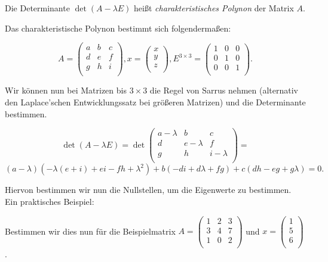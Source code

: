 \documentclass{scrartcl}
\begin{document}
Die Determinante $\det\left(A - \lambda E\right)$ heißt \textit{charakteristisches Polynon} der Matrix $A$.

Das charakteristische Polynon bestimmt sich folgendermaßen:

\begin{equation}
	A = \begin{pmatrix*}
		a & b & c \\
		d & e & f \\
		g & h & i \\
	\end{pmatrix*},
	x = \begin{pmatrix*}
		x \\
		y \\
		z \\
	\end{pmatrix*},
	E^{3\times 3} = \begin{pmatrix*}
		1 & 0 & 0 \\
		0 & 1 & 0 \\
		0 & 0 & 1 \\
	\end{pmatrix*}.
\end{equation}

Wir können nun bei Matrizen bis $3 \times 3$ die Regel von Sarrus nehmen (alternativ
den Laplace'schen Entwicklungssatz bei größeren Matrizen) und die Determinante 
bestimmen.

\begin{equation}
	\det(A - \lambda E) = \det\begin{pmatrix*}
		a - \lambda	& b		& c		\\
		d		& e - \lambda	& f		\\
		g		& h		& i - \lambda	\\
	\end{pmatrix*} =
\end{equation}
\begin{equation}
	(a - \lambda)(-\lambda(e + i)+ei -fh + \lambda^2) +b(-di + d\lambda + fg) + c(dh - eg + g\lambda) = 0.
\end{equation}

Hiervon bestimmen wir nun die Nullstellen, um die Eigenwerte zu bestimmen. Ein praktisches Beispiel:

Bestimmen wir dies nun für die Beispielmatrix $A = \begin{pmatrix*}
	1 & 2 & 3 \\
	3 & 4 & 7 \\
	1 & 0 & 2 \\
\end{pmatrix*}$ und $x = \begin{pmatrix*}
	1 \\
	5 \\
	6 \\
\end{pmatrix*}$.
\end{document}
